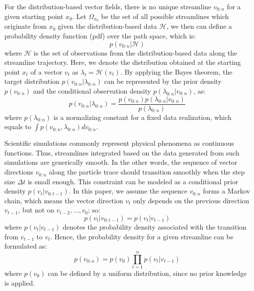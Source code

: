 For the distribution-based vector fields, there is no unique streamline $v_{0:n}$ for a given starting point $x_0$. Let $\Omega_{x_0}$ be the set of all possible streamlines which originate from $x_0$ given the distribution-based data $\mathcal{H}$, we then can define a probability density function (pdf) over the path space, which is:
\begin{equation}
  p(v_{0:n}|\mathcal{H})
\end{equation}
where $\mathcal{H}$ is the set of observations from the distribution-based data along the streamline trajectory. Here, we denote the distribution obtained at the starting point $x_t$ of a vector $v_t$ as $\lambda_t=\mathcal{H}(v_t)$. By applying the Bayes theorem, the target distribution $p({v_{0:n}}|{\lambda_{0:n}})$ can be represented by the prior density $p({v_{0:n}})$ and the conditional observation density $p({\lambda_{0:n}}|{v_{0:n}})$, as:
\begin{equation}
  p({v_{0:n}}|{\lambda_{0:n}}) = \frac{{p({v_{0:n}})p({\lambda_{0:n}}|{v_{0:n}})}}{{p({\lambda_{0:n}})}}
\end{equation}
where ${p({\lambda_{0:n}})}$ is a normalizing constant for a fixed data realization, which equals to $\int {p({v_{0:n}},{\lambda_{0:n}})} d{v_{0:n}}$.

Scientific simulations commonly represent physical phenomena as continuous functions. Thus, streamlines integrated based on the data generated from such simulations are generically smooth. In the other words, the sequence of vector directions $v_{0:n}$ along the particle trace should transition smoothly when the step size $\Delta t$ is small enough. This constraint can be modeled as a conditional prior density $p({v_t}|{v_{0:t - 1}})$. In this paper, we assume the sequence $v_{0:n}$ forms a Markov chain, which means the vector direction $v_t$ only depends on the previous direction $v_{t-1}$, but not on $v_{t-2},...,v_0$; so:
\begin{equation}
  p({v_t}|{v_{0:t - 1}}) = p({v_t}|{v_{t - 1}})
\end{equation}
where $p({v_t}|{v_{t - 1}})$ denotes the probability density associated with the transition from $v_{t - 1}$ to $v_t$. Hence, the probability density for a given streamline can be formulated as:
\begin{equation}
  p({v_{0:n}}) = p({v_0})\prod\limits_{t = 1}^n {p({v_t}|{v_{t - 1}})}
\end{equation}
where $p(v_0)$ can be defined by a uniform distribution, since no prior knowledge is applied.

